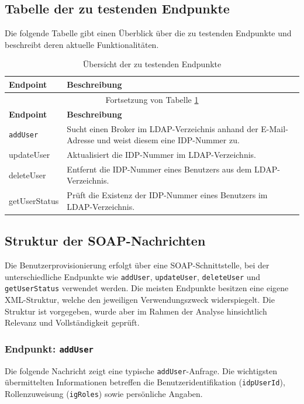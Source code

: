 \subsection{Tabelle der zu testenden Endpunkte}
Die folgende Tabelle gibt einen Überblick über die zu testenden Endpunkte und beschreibt deren aktuelle Funktionalitäten.
\begin{longtable}{|p{4cm}|p{10cm}|}
  \caption{Übersicht der zu testenden Endpunkte} \label{tab:endpoints} \\
  \hline
  \textbf{Endpoint} & \textbf{Beschreibung} \\
  \hline
  \endfirsthead
  \multicolumn{2}{c}{Fortsetzung von Tabelle \ref{tab:endpoints}} \\
  \hline
  \textbf{Endpoint} & \textbf{Beschreibung} \\
  \hline
  \endhead
  \hline
  \endfoot
  \texttt{addUser} & Sucht einen Broker im LDAP-Verzeichnis anhand der E-Mail-Adresse und weist diesem eine IDP-Nummer zu. \\
  \hline
  updateUser & Aktualisiert die IDP-Nummer im LDAP-Verzeichnis. \\
  \hline
  deleteUser & Entfernt die IDP-Nummer eines Benutzers aus dem LDAP-Verzeichnis. \\
  \hline
  getUserStatus & Prüft die Existenz der IDP-Nummer eines Benutzers im LDAP-Verzeichnis. \\
  \hline
\end{longtable}


\subsection{Struktur der SOAP-Nachrichten}

Die Benutzerprovisionierung erfolgt über eine SOAP-Schnittstelle, bei der unterschiedliche Endpunkte wie \texttt{addUser}, \texttt{updateUser}, \texttt{deleteUser} und \texttt{getUserStatus} verwendet werden. Die meisten Endpunkte besitzen eine eigene XML-Struktur, welche den jeweiligen Verwendungszweck widerspiegelt. Die Struktur ist vorgegeben, wurde aber im Rahmen der Analyse hinsichtlich Relevanz und Vollständigkeit geprüft.

\subsubsection*{Endpunkt: \texttt{addUser}}

Die folgende Nachricht zeigt eine typische \texttt{addUser}-Anfrage. Die wichtigsten übermittelten Informationen betreffen die Benutzeridentifikation (\texttt{idpUserId}), Rollenzuweisung (\texttt{igRoles}) sowie persönliche Angaben.

